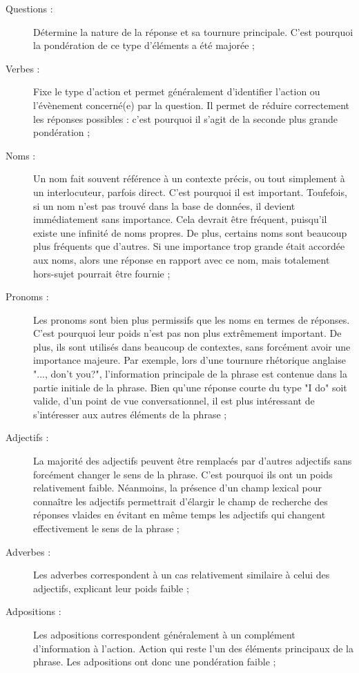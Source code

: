 \begin{description}
  \item[Questions :] Détermine la nature de la réponse et sa tournure principale. C'est pourquoi la pondération de ce type d'éléments a été majorée ;
  \item[Verbes :] Fixe le type d'action et permet généralement d'identifier l'action ou l'évènement concerné(e) par la question. Il permet de réduire correctement les réponses possibles : c'est pourquoi il s'agit de la seconde plus grande pondération ;
  \item[Noms :] Un nom fait souvent référence à un contexte précis, ou tout simplement à un interlocuteur, parfois direct. C'est pourquoi il est important. Toufefois, si un nom n'est pas trouvé dans la base de données, il devient immédiatement sans importance. Cela devrait être fréquent, puisqu'il existe une infinité de noms propres. De plus, certains noms sont beaucoup plus fréquents que d'autres. Si une importance trop grande était accordée aux noms, alors une réponse en rapport avec ce nom, mais totalement hors-sujet pourrait être fournie ;
  \item[Pronoms :] Les pronoms sont bien plus permissifs que les noms en termes de réponses. C'est pourquoi leur poids n'est pas non plus extrêmement important. De plus, ils sont utilisés dans beaucoup de contextes, sans forcément avoir une importance majeure. Par exemple, lors d'une tournure rhétorique anglaise "..., don't you?", l'information principale de la phrase est contenue dans la partie initiale de la phrase. Bien qu'une réponse courte du type "I do" soit valide, d'un point de vue conversationnel, il est plus intéressant de s'intéresser aux autres éléments de la phrase ; 
  \item[Adjectifs :] La majorité des adjectifs peuvent être remplacés par d'autres adjectifs sans forcément changer le sens de la phrase. C'est pourquoi ils ont un poids relativement faible. Néanmoins, la présence d'un champ lexical pour connaître les adjectifs permettrait d'élargir le champ de recherche des réponses vlaides en évitant en même temps les adjectifs qui changent effectivement le sens de la phrase ;
  \item[Adverbes :] Les adverbes correspondent à un cas relativement similaire à celui des adjectifs, explicant leur poids faible ;
  \item[Adpositions :] Les adpositions correspondent généralement à un complément d'information à l'action. Action qui reste l'un des éléments principaux de la phrase. Les adpositions ont donc une pondération faible ;

\end{description}

